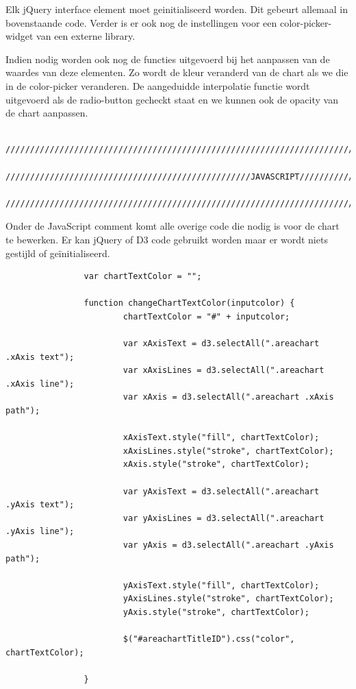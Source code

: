 Elk jQuery interface element moet geinitialiseerd worden. Dit gebeurt allemaal in bovenstaande code. Verder is er ook nog de instellingen voor een color-picker-widget van een externe library.

Indien nodig worden ook nog de functies uitgevoerd bij het aanpassen van de waardes van deze elementen. Zo wordt de kleur veranderd van de chart als we die in de color-picker veranderen. De aangeduidde interpolatie functie wordt uitgevoerd als de radio-button gecheckt staat en we kunnen ook de opacity van de chart aanpassen.

\begin{lstlisting}
                 /////////////////////////////////////////////////////////////////////////////////////////////////////////////////////////////
                 //////////////////////////////////////////////////JAVASCRIPT/////////////////////////////////////////////////////////////////
                 /////////////////////////////////////////////////////////////////////////////////////////////////////////////////////////////
\end{lstlisting}

Onder de JavaScript comment komt alle overige code die nodig is voor de chart te bewerken. Er kan jQuery of D3 code gebruikt worden maar er wordt niets gestijld of ge\"{i}nitialiseerd.

\begin{lstlisting}
                var chartTextColor = "";

                function changeChartTextColor(inputcolor) {
                        chartTextColor = "#" + inputcolor;

                        var xAxisText = d3.selectAll(".areachart .xAxis text");
                        var xAxisLines = d3.selectAll(".areachart .xAxis line");
                        var xAxis = d3.selectAll(".areachart .xAxis path");

                        xAxisText.style("fill", chartTextColor);
                        xAxisLines.style("stroke", chartTextColor);
                        xAxis.style("stroke", chartTextColor);

                        var yAxisText = d3.selectAll(".areachart .yAxis text");
                        var yAxisLines = d3.selectAll(".areachart .yAxis line");
                        var yAxis = d3.selectAll(".areachart .yAxis path");

                        yAxisText.style("fill", chartTextColor);
                        yAxisLines.style("stroke", chartTextColor);
                        yAxis.style("stroke", chartTextColor);

                        $("#areachartTitleID").css("color", chartTextColor);

                }
\end{lstlisting}

